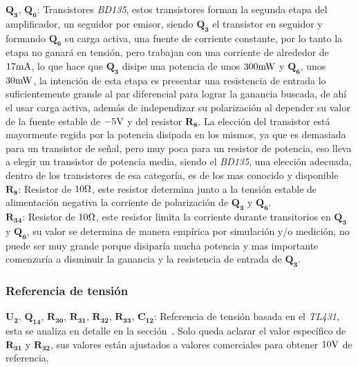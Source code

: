 $\bm{Q_{3}}$, $\bm{Q_{6}}$: Transistores \textit{BD135}, estos transistores forman la segunda etapa del amplificador, un seguidor por emisor, siendo $\bm{Q_{3}}$ el transistor en seguidor y formando $\bm{Q_{6}}$ su carga activa, una fuente de corriente constante, por lo tanto la etapa no ganará en tensión, pero trabajan con una corriente de alrededor de $17 \si[per-mode=symbol]{\milli\ampere}$, lo que hace que $\bm{Q_{3}}$ disipe una potencia de unos $300 \si[per-mode=symbol]{\milli\watt}$ y $\bm{Q_{6}}$, unos $30 \si[per-mode=symbol]{\milli\watt}$, la intención de esta etapa es presentar una resistencia de entrada lo suficientemente grande al par diferencial para lograr la ganancia buscada, de ahí el usar carga activa, además de independizar su polarización al depender su valor de la fuente estable de $-5 \si[per-mode=symbol]{\volt}$ y del resistor $\bm{R_{8}}$. La elección del transistor está mayormente regida por la potencia disipada en los mismos, ya que es demasiada para un transistor de señal, pero muy poca para un resistor de potencia, eso lleva a elegir un transistor de potencia media, siendo el \textit{BD135}, una elección adecuada, dentro de los transistores de esa categoría, es de los mas conocido y disponible\\

$\bm{R_{8}}$: Resistor de $10 \si[per-mode=symbol]{\ohm}$, este resistor determina junto a la tensión estable de alimentación negativa la corriente de polarización de $\bm{Q_{3}}$ y $\bm{Q_{6}}$.\\

$\bm{R_{34}}$: Resistor de $10 \si[per-mode=symbol]{\ohm}$, este resistor limita la corriente durante transitorios en $\bm{Q_{3}}$ y $\bm{Q_{6}}$, su valor se determina de manera empírica por simulación y/o medición, no puede ser muy grande porque disiparía mucha potencia y mas importante comenzaría a disminuir la ganancia y la resistencia de entrada de $\bm{Q_{3}}$.\\


\subsubsection{Referencia de tensión}

$\bm{U_{2}}$, $\bm{Q_{14}}$, $\bm{R_{30}}$, $\bm{R_{31}}$, $\bm{R_{32}}$, $\bm{R_{33}}$, $\bm{C_{12}}$: Referencia de tensión basada en el \textit{TL431}, esta se analiza en detalle en la sección~. Solo queda aclarar el valor específico de $\bm{R_{31}}$ y $\bm{R_{32}}$, sus valores están ajustados a valores comerciales para obtener $10 \si[per-mode=symbol]{\volt}$ de referencia.\\


